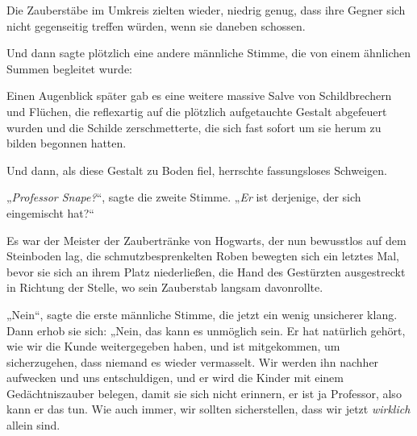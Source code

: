 Die Zauberstäbe im Umkreis zielten wieder, niedrig genug, dass ihre Gegner sich nicht gegenseitig treffen würden, wenn sie daneben schossen.

Und dann sagte plötzlich eine andere männliche Stimme, die von einem ähnlichen Summen begleitet wurde: 

Einen Augenblick später gab es eine weitere massive Salve von Schildbrechern und Flüchen, die reflexartig auf die plötzlich aufgetauchte Gestalt abgefeuert wurden und die Schilde zerschmetterte, die sich fast sofort um sie herum zu bilden begonnen hatten.

Und dann, als diese Gestalt zu Boden fiel, herrschte fassungsloses Schweigen.

„\emph{Professor Snape?}“, sagte die zweite Stimme.
„\emph{Er} ist derjenige, der sich eingemischt hat?“

Es war der Meister der Zaubertränke von Hogwarts, der nun bewusstlos auf dem Steinboden lag, die schmutzbesprenkelten Roben bewegten sich ein letztes Mal, bevor sie sich an ihrem Platz niederließen, die Hand des Gestürzten ausgestreckt in Richtung der Stelle, wo sein Zauberstab langsam davonrollte.

„Nein“, sagte die erste männliche Stimme, die jetzt ein wenig unsicherer klang. Dann erhob sie sich:
„Nein, das kann es unmöglich sein. Er hat natürlich gehört, wie wir die Kunde weitergegeben haben, und ist mitgekommen, um sicherzugehen, dass niemand es wieder vermasselt. Wir werden ihn nachher aufwecken und uns entschuldigen, und er wird die Kinder mit einem Gedächtniszauber belegen, damit sie sich nicht erinnern, er ist ja Professor, also kann er das tun. Wie auch immer, wir sollten sicherstellen, dass wir jetzt \emph{wirklich} allein sind. 


